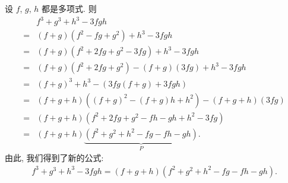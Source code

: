 \begin{example}
    设 $f$, $g$, $h$ 都是多项式. 则
    \begin{align*}
             & f^3 + g^3 + h^3 - 3fgh                                        \\
        = {} & (f + g)(f^2 - fg + g^2) + h^3 - 3fgh                          \\
        = {} & (f + g)(f^2 + 2fg + g^2 - 3fg) + h^3 - 3fgh                   \\
        = {} & (f + g)(f^2 + 2fg + g^2) - (f + g)(3fg) + h^3 - 3fgh          \\
        = {} & (f + g)^3 + h^3 - (3fg(f + g) + 3fgh)                         \\
        = {} & (f + g + h)((f + g)^2 - (f + g)h + h^2) - (f + g + h)(3fg)    \\
        = {} & (f + g + h)(f^2 + 2fg + g^2 - fh - gh + h^2 - 3fg)            \\
        = {} & (f + g + h)\underbrace{(f^2 + g^2 + h^2 - fg - fh - gh)}_{P}.
    \end{align*}
    由此, 我们得到了新的公式:
    \begin{align*}
        f^3 + g^3 + h^3 - 3fgh = (f + g + h)(f^2 + g^2 + h^2 - fg - fh - gh).
    \end{align*}


\end{example}

